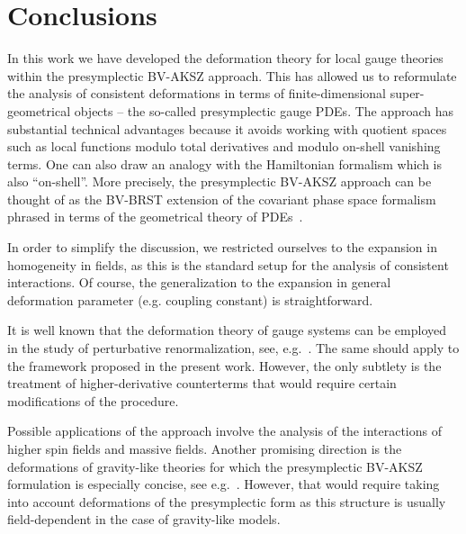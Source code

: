 \documentclass[a4paper,12pt]{article}
\numberwithin{equation}{section} %
\begin{document}
\section{Conclusions}

In this work we have developed the deformation theory for local gauge theories within the  presymplectic BV-AKSZ approach. This has allowed us to reformulate the analysis of consistent deformations in terms of finite-dimensional super-geometrical objects -- the so-called presymplectic gauge PDEs. The approach has substantial technical advantages because it avoids working with quotient spaces such as local functions modulo total derivatives and modulo on-shell vanishing terms. One can also draw an analogy with the Hamiltonian formalism which is also ``on-shell''. More precisely, the presymplectic BV-AKSZ approach can be thought of as the BV-BRST extension of the covariant phase space formalism~\cite{Lee:1990nz,Wald:1999wa} phrased in terms of the geometrical theory of PDEs~\cite{Vinogradov1981,Krasil?shchik-Lychagin-Vinogradov}.

In order to simplify the discussion, we restricted ourselves to the expansion in homogeneity in fields, as this is the standard setup for the analysis of consistent interactions. Of course, the generalization to the expansion in general deformation parameter (e.g. coupling constant) is straightforward. 

It is well known that the deformation theory of gauge systems can be employed in the study of perturbative renormalization, see, e.g.~\cite{Piguet:1995er,Barnich:2000me}. The same should apply to the framework proposed in the present work. However, the only subtlety is the treatment of higher-derivative counterterms that would require certain modifications of the procedure.

Possible applications of the approach involve the analysis of the interactions of higher spin fields and massive fields. Another promising direction is the deformations of gravity-like theories for which the presymplectic BV-AKSZ formulation is especially concise, see e.g.~\cite{Grigoriev:2020xec,Dneprov:2022jyn,Dneprov:2024cvt,Grigoriev:2024ecv}. However, that would require taking into account deformations of the presymplectic form as this structure is usually field-dependent in the case of gravity-like models.








\end{document}
